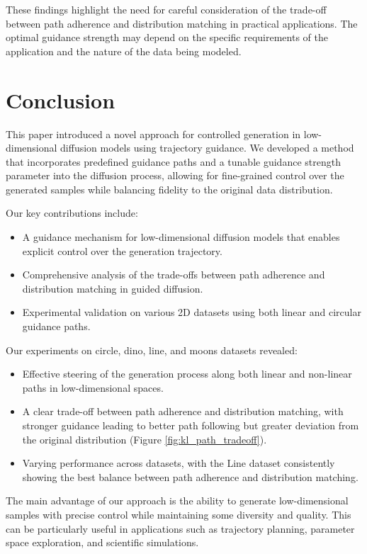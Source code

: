 \documentclass{article} %
\begin{document}
These findings highlight the need for careful consideration of the trade-off between path adherence and distribution matching in practical applications. The optimal guidance strength may depend on the specific requirements of the application and the nature of the data being modeled.

\section{Conclusion}
\label{sec:conclusion}

This paper introduced a novel approach for controlled generation in low-dimensional diffusion models using trajectory guidance. We developed a method that incorporates predefined guidance paths and a tunable guidance strength parameter into the diffusion process, allowing for fine-grained control over the generated samples while balancing fidelity to the original data distribution.

Our key contributions include:

\begin{itemize}
    \item A guidance mechanism for low-dimensional diffusion models that enables explicit control over the generation trajectory.
    \item Comprehensive analysis of the trade-offs between path adherence and distribution matching in guided diffusion.
    \item Experimental validation on various 2D datasets using both linear and circular guidance paths.
\end{itemize}

Our experiments on circle, dino, line, and moons datasets revealed:

\begin{itemize}
    \item Effective steering of the generation process along both linear and non-linear paths in low-dimensional spaces.
    \item A clear trade-off between path adherence and distribution matching, with stronger guidance leading to better path following but greater deviation from the original distribution (Figure \ref{fig:kl_path_tradeoff}).
    \item Varying performance across datasets, with the Line dataset consistently showing the best balance between path adherence and distribution matching.
\end{itemize}

The main advantage of our approach is the ability to generate low-dimensional samples with precise control while maintaining some diversity and quality. This can be particularly useful in applications such as trajectory planning, parameter space exploration, and scientific simulations.
\end{document}
